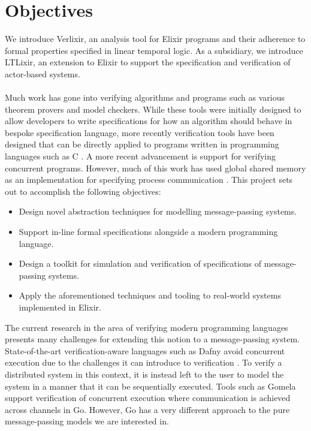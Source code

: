 \section{Objectives}
We introduce Verlixir, an analysis tool for Elixir programs and their adherence to formal properties specified in linear temporal logic. As a subsidiary, we introduce LTLixir, an extension to Elixir to support the specification and verification of actor-based systems. 
\\ \\
Much work has gone into verifying algorithms and programs such as various theorem provers and model checkers. While these tools were initially designed to allow developers to write specifications for how an algorithm should behave in bespoke specification language, more recently verification tools have been designed that can be directly applied to programs written in programming languages such as C \cite{c_to_promela}. A more recent advancement is support for verifying concurrent programs. However, much of this work has used global shared memory as an implementation for specifying process communication \cite{java_pathfinder}. This project sets out to accomplish the following objectives:
\begin{itemize}
    \item Design novel abstraction techniques for modelling message-passing systems.
    \item Support in-line formal specifications alongside a modern programming language.
    \item Design a toolkit for simulation and verification of specifications of message-passing systems.
    \item Apply the aforementioned techniques and tooling to real-world systems implemented in Elixir.
\end{itemize}
The current research in the area of verifying modern programming languages presents many challenges for extending this notion to a message-passing system. State-of-the-art verification-aware languages such as Dafny avoid concurrent execution due to the challenges it can introduce to verification \cite{dafny_concurrency}. To verify a distributed system in this context, it is instead left to the user to model the system in a manner that it can be sequentially executed. Tools such as Gomela \cite{gomela} support verification of concurrent execution where communication is achieved across channels in Go. However, Go has a very different approach to the pure message-passing models we are interested in.
